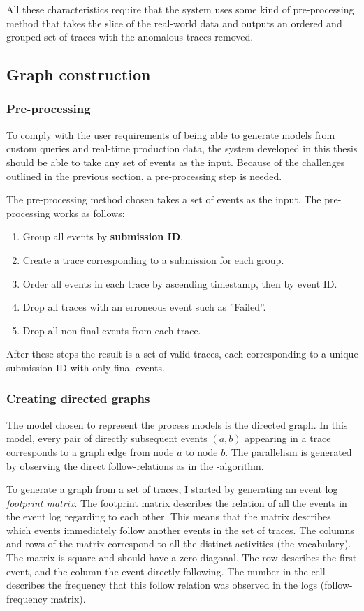\documentclass[english,12pt,a4paper,pdftex,sci,utf8]{aaltothesis}
\theoremstyle{definition}
\begin{document}
All these characteristics require that the system uses some kind of pre-processing method that takes the slice of the real-world data and outputs an ordered and grouped set of traces with the anomalous traces removed.

\subsection{Graph construction}

\subsubsection{Pre-processing}

To comply with the user requirements of being able to generate models from custom queries and real-time production data, the system developed in this thesis should be able to take any set of events as the input.
Because of the challenges outlined in the previous section, a pre-processing step is needed.

The pre-processing method chosen takes a set of events as the input. The pre-processing works as follows:
\begin{enumerate}
    \item Group all events by \textbf{submission ID}.
    \item Create a trace corresponding to a submission for each group.
    \item Order all events in each trace by ascending timestamp, then by event ID.
    \item Drop all traces with an erroneous event such as ''Failed''.
    \item Drop all non-final events from each trace.
\end{enumerate}
After these steps the result is a set of valid traces, each corresponding to a unique submission ID with only final events.

\subsubsection{Creating directed graphs}

The model chosen to represent the process models is the directed graph. 
In this model, every pair of directly subsequent events $(a,b)$ appearing in a trace corresponds to a 
graph edge from node $a$ to node $b$.
The parallelism is generated by observing the direct follow-relations as in the \textalpha-algorithm.

To generate a graph from a set of traces, I started by generating an event log \emph{footprint matrix}.
The footprint matrix describes the relation of all the events in the event log regarding to each other.
This means that the matrix describes which events immediately follow another events in the set of traces.
The columns and rows of the matrix correspond to all the distinct activities (the vocabulary).
The matrix is square and should have a zero diagonal.
The row describes the first event, and the column the event directly following.
The number in the cell describes the frequency that this follow relation was observed in the logs (follow-frequency matrix).
\end{document}
